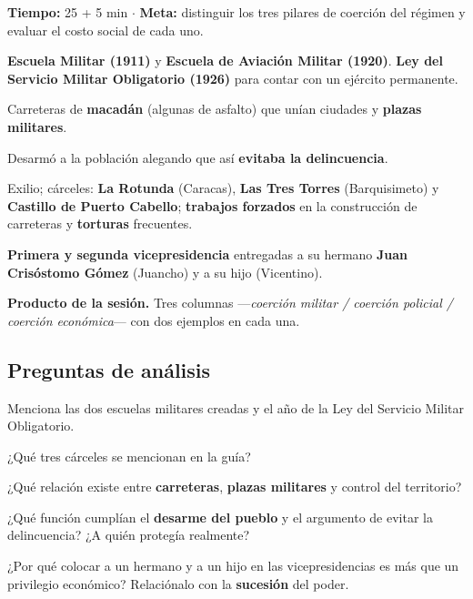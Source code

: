 \documentclass[12pt, letterpaper]{article}
\newcommand{\metasesion}[2]{%
  \begin{cabecerasesion}
    \small
    \textbf{\color{mwprimario}Tiempo:} #1 \quad$\cdot$\quad
    \textbf{\color{mwprimario}Meta:} #2
  \end{cabecerasesion}%
}
\begin{document}
\metasesion{25 + 5 min}{distinguir los tres pilares de coerción del régimen y
evaluar el costo social de cada uno.}

\begin{description}[leftmargin=1.2em, itemsep=5pt, style=nextline]
  \item[\textbf{Profesionalización militar.}]
  \textbf{Escuela Militar (1911)} y \textbf{Escuela de Aviación Militar (1920)}.
  \textbf{Ley del Servicio Militar Obligatorio (1926)} para contar con un
  ejército permanente.

  \item[\textbf{Control del territorio.}]
  Carreteras de \textbf{macadán} (algunas de asfalto) que unían ciudades y
  \textbf{plazas militares}.

  \item[\textbf{Desarme del pueblo.}]
  Desarmó a la población alegando que así \textbf{evitaba la delincuencia}.

  \item[\textbf{Represión.}]
  Exilio; cárceles: \textbf{La Rotunda} (Caracas), \textbf{Las Tres Torres}
  (Barquisimeto) y \textbf{Castillo de Puerto Cabello}; \textbf{trabajos
  forzados} en la construcción de carreteras y \textbf{torturas} frecuentes.

  \item[\textbf{Nepotismo.}]
  \textbf{Primera y segunda vicepresidencia} entregadas a su hermano
  \textbf{Juan Crisóstomo Gómez} (\guillemotleft Juancho\guillemotright) y a su
  hijo (\guillemotleft Vicentino\guillemotright).
\end{description}

\begin{cuadropasos}
  \small
  \textbf{Producto de la sesión.} Tres columnas ---\textit{coerción militar /
  coerción policial / coerción económica}--- con dos ejemplos en cada una.
\end{cuadropasos}

\subsection*{Preguntas de análisis}
\begin{preguntas}
  \item \facil{} Menciona las dos escuelas militares creadas y el año de la Ley
        del Servicio Militar Obligatorio.
  \item \facil{} ¿Qué tres cárceles se mencionan en la guía?
  \item \medio{} ¿Qué relación existe entre \textbf{carreteras},
        \textbf{plazas militares} y control del territorio?
  \item \dificil{} ¿Qué función cumplían el \textbf{desarme del pueblo} y el
        argumento de \guillemotleft evitar la delincuencia\guillemotright?
        ¿A quién protegía realmente?
  \item \muyDificil{} ¿Por qué colocar a un hermano y a un hijo en las
        vicepresidencias es más que un privilegio económico? Relaciónalo con la
        \textbf{sucesión} del poder.
\end{preguntas}
\end{document}
